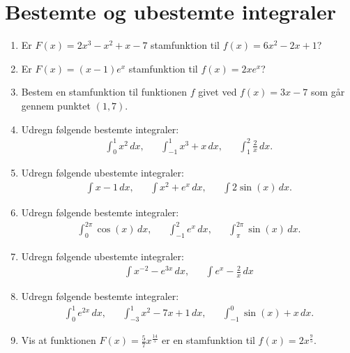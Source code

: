 \section{Bestemte og ubestemte integraler}

\begin{enumerate}
	\item Er $F(x)=2x^3-x^2+x-7$ stamfunktion til $f(x)=6x^2-2x+1$?
	
	
	\item Er $F(x)=(x-1)e^x$ stamfunktion til $f(x)=2xe^x$?
	
	\item Bestem en stamfunktion til funktionen $f$ givet ved $f(x)=3x-7$ som går gennem punktet $ (1,7) $.
	
	\item Udregn følgende bestemte integraler:
	\begin{align*}
	\int_0^1 x^2 \, dx,&& \int_{-1}^1 x^3+x \, dx, && \int_1^2 \frac{2}{x}\, dx. 
	\end{align*}
		
	
	\item Udregn følgende ubestemte integraler:
	\begin{align*}
	\int x-1 \, dx, && \int x^2+e^x \, dx,&& \int 2\sin(x)\, dx.
	\end{align*}
	
	\item Udregn følgende bestemte integraler:
	\begin{align*}
	\int_{0}^{2\pi} \cos(x) \, dx,&& \int_{-1}^2 e^x \, dx, && \int_{\pi}^{2\pi} \sin(x) \, dx.
	\end{align*}
	
	\item Udregn følgende ubestemte integraler:
	\begin{align*}
	\int x^{-2}-e^{3x} \,dx ,&& \int e^{x}-\frac{2}{x}\, dx
	\end{align*}
	
	
	\item Udregn følgende bestemte integraler:
	\begin{align*}
	\int_0^1 e^{2x}\, dx,&& \int_{-3}^1 x^2 -7x+1 \, dx,&& \int_{-1}^0 \sin(x)+x\, dx.
	\end{align*}
	
	
	
	
	
	

	
	\item Vis at funktionen $F(x)=\frac{5}{7}x^{\frac{14}{5}}$ er en stamfunktion til $f(x)=2x^{\frac{9}{5}}$.
	

\end{enumerate}
